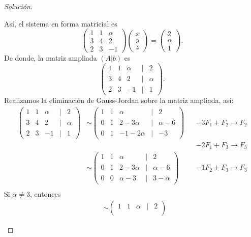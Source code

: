 \documentclass[a4,11pt]{aleph-notas}
\begin{document}
\begin{proof}[Solución]
\begin{enumerate}
    Así, el sistema en forma matricial es
    \[
        \begin{pmatrix}
        1&1&\alpha\\3&4&2\\2&3&-1
        \end{pmatrix}
        \begin{pmatrix}
        x \\ y\\ z
        \end{pmatrix}
        =
        \begin{pmatrix}
        2 \\ \alpha\\ 1
        \end{pmatrix}.
    \]
    De donde, la matriz ampliada $(A|b)$ es
    \[
        \begin{pmatrix}
        1&1&\alpha&|&2\\
        3&4&2&|&\alpha\\
        2&3&-1&|&1
        \end{pmatrix}.
    \]
    Realizamos la eliminación de Gauss-Jordan sobre la matriz ampliada, así:
        \begin{align*}
        \begin{pmatrix}
        1&1&\alpha&|&2\\
        3&4&2&|&\alpha\\
        2&3&-1&|&1
        \end{pmatrix}
        & \sim 
        \begin{pmatrix}
        1&1&\alpha&|&2\\
        0&1&2-3\alpha&|&\alpha - 6\\
        0&1&-1-2 \alpha&|&-3
        \end{pmatrix}
        && -3F_1+F_2\to F_2\\
        &&&-2F_1+F_3\to F_3\\
        & \sim 
        \begin{pmatrix}
        1&1&\alpha&|&2\\
        0&1&2-3\alpha&|&\alpha - 6\\
        0&0&\alpha - 3&|& 3 - \alpha
        \end{pmatrix}
        && -1F_2+F_3\to F_3\\
        \end{align*}
    Si $\alpha \neq 3$, entonces 
    \begin{align*}
        & \sim 
        \begin{pmatrix}
        1&1&\alpha&|&2\\

\end{pmatrix}
\end{align*}
\end{enumerate}
\end{proof}
\end{document}
